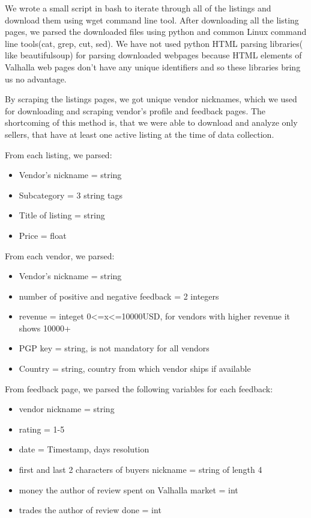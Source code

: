 \documentclass[
  digital, %
  table,   %
  lof,     %
  lot,     %
  oneside
]{fithesis3}
\begin{document}
We wrote a small script in bash to iterate through all of the listings
and download them using wget command line tool.
After downloading all the listing pages,
we parsed the downloaded files using python and common Linux command line tools(cat, grep, cut, sed).
We have not used python HTML parsing libraries( like beautifulsoup) for parsing downloaded
webpages because HTML elements of Valhalla web pages don't have any unique identifiers
and so these libraries bring us no advantage.
 
By scraping the listings pages, we got unique vendor nicknames,
which we used for downloading and scraping vendor's profile and feedback pages.
The shortcoming of this method is, that we were able to download and analyze only sellers, 
that have at least one active listing at the time of data collection. 

From each listing, we parsed:

\begin{itemize}
 \item Vendor's nickname = string
 \item Subcategory = 3 string tags
 \item Title of listing = string
 \item Price = float
\end{itemize}

From each vendor, we parsed:
\begin{itemize}
\item Vendor's nickname = string
\item number of positive and negative feedback = 2 integers
\item revenue = integet 0<=x<=10000USD, for vendors with higher revenue it shows 10000+
\item PGP key = string, is not mandatory for all vendors
\item Country = string, country from which vendor ships if available
\end{itemize}

From feedback page, we parsed the following variables for each feedback:
\begin{itemize}
\item vendor nickname = string
\item rating = 1-5
\item date = Timestamp, days resolution
\item first and last 2 characters of buyers nickname = string of length 4
\item money the author of review spent on Valhalla market = int
\item trades the author of review done = int
\end{itemize}
\end{document}
